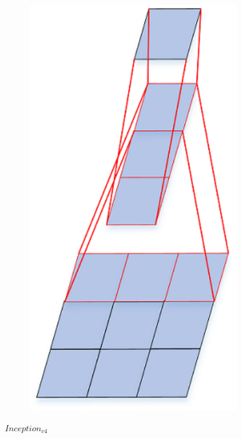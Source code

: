 \begin{figure}
\centering
\includegraphics[width=0.8\textwidth]{./img/ch4/image37.png}
\caption{}
\end{figure}

\(Inception_{v4}\)

